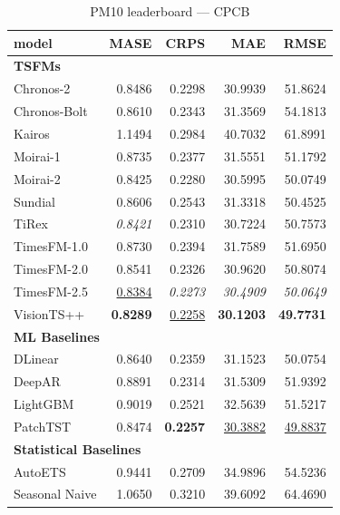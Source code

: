 \begin{table}[H]
\caption{PM10 leaderboard --- CPCB}
\centering
\begin{small}
\begin{tabular}{lrrrr}
\toprule
model & MASE & CRPS & MAE & RMSE \\
\midrule
\multicolumn{5}{l}{\textbf{TSFMs}} \\
Chronos-2 & 0.8486 & 0.2298 & 30.9939 & 51.8624 \\
Chronos-Bolt & 0.8610 & 0.2343 & 31.3569 & 54.1813 \\
Kairos & 1.1494 & 0.2984 & 40.7032 & 61.8991 \\
Moirai-1 & 0.8735 & 0.2377 & 31.5551 & 51.1792 \\
Moirai-2 & 0.8425 & 0.2280 & 30.5995 & 50.0749 \\
Sundial & 0.8606 & 0.2543 & 31.3318 & 50.4525 \\
TiRex & \textit{0.8421} & 0.2310 & 30.7224 & 50.7573 \\
TimesFM-1.0 & 0.8730 & 0.2394 & 31.7589 & 51.6950 \\
TimesFM-2.0 & 0.8541 & 0.2326 & 30.9620 & 50.8074 \\
TimesFM-2.5 & \underline{0.8384} & \textit{0.2273} & \textit{30.4909} & \textit{50.0649} \\
VisionTS++ & \textbf{0.8289} & \underline{0.2258} & \textbf{30.1203} & \textbf{49.7731} \\
\midrule
\multicolumn{5}{l}{\textbf{ML Baselines}} \\
DLinear & 0.8640 & 0.2359 & 31.1523 & 50.0754 \\
DeepAR & 0.8891 & 0.2314 & 31.5309 & 51.9392 \\
LightGBM & 0.9019 & 0.2521 & 32.5639 & 51.5217 \\
PatchTST & 0.8474 & \textbf{0.2257} & \underline{30.3882} & \underline{49.8837} \\
\midrule
\multicolumn{5}{l}{\textbf{Statistical Baselines}} \\
AutoETS & 0.9441 & 0.2709 & 34.9896 & 54.5236 \\
Seasonal Naive & 1.0650 & 0.3210 & 39.6092 & 64.4690 \\
\bottomrule
\end{tabular}
\end{small}
\end{table}
